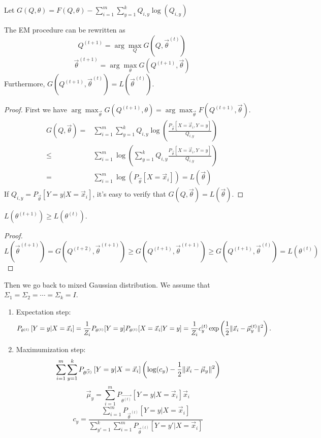 Let $ G(Q, \theta) = F(Q, \theta) - \sum^{m}_{i=1} \sum^{k}_{y=1} Q_{i,y} \log(Q_{i,y})  $

\begin{lemma}
    The EM procedure can be rewritten as
    \[
        Q^{(t+1)} = \arg\max_{Q} G(Q, \vec{\theta}^{(t)})
    \]
    \[
        \vec{\theta}^{(t+1)} = \arg\max_{\theta}G(Q ^{(t+1)}, \vec{\theta})
    \]
    Furthermore, $ G(Q^{(t+1)}, \vec{\theta}^{(t)}) = L(\vec{\theta}^{(t)}) $.
    \begin{proof}
        First we have $ \arg\max_{\vec{\theta}} G(Q^{(t+1)}, \theta) = \arg\max_{\vec{\theta}} F(Q^{(t+1)}, \vec{\theta})$.
        \begin{align*}
            G(Q, \vec{\theta}) =& \sum^{m}_{i=1} \sum^{k}_{y=1} Q_{i,y}\log \left( \frac{P_{\vec{\theta}} \left[ X = \vec{x}_i, Y = y \right]}{Q_{i,y}}  \right)\\
            \le& \sum^{m}_{i=1} \log \left( \sum^{k}_{y=1} Q_{i,y}\frac{P_{\vec{\theta}} \left[ X = \vec{x}_i, Y = y \right]}{Q_{i,y}}  \right)\\
            =& \sum^{m}_{i=1} \log \left( P_{\vec{\theta}}\left[ X = \vec{x}_i \right] \right) = L(\vec{\theta})
        \end{align*}
        If $ Q_{i,y} = P_{\vec{\theta}} \left[ Y = y | X = \vec{x}_i \right] $, it's easy to verify that $ G(Q, \vec{\theta}) = L(\vec{\theta}) $.
    \end{proof}
\end{lemma}
\begin{theorem}
    $ L(\theta^{(t+1)}) \ge L(\theta^{(t)}) $.
    \begin{proof}
        $ L(\vec{\theta}^{(t+1)}) = G(Q^{(t+2)}, \vec{\theta}^{(t+1)}) \ge G(Q^{(t+1)}, \vec{\theta}^{(t+1)}) \ge G(Q^{(t+1)}, \vec{\theta}^{(t)}) = L(\theta^{(t)}) $
    \end{proof}
\end{theorem}

Then we go back to mixed Gaussian distribution.
We assume that $ \Sigma_1 = \Sigma_2 = \cdots = \Sigma_k = I $.
\begin{enumerate}
    \item Expectation step:
        \[
            P_{\theta^{(t)}} \left[ Y = y | X = \vec{x}_i \right] = \frac{1}{Z_i} P_{\theta^{(t)}} [Y = y] P_{\theta^{(t)}}[X = \vec{x}_i | Y = y] = \frac{1}{Z_i} c^{(t)}_{y} \exp\left( \frac{1}{2} \Arrowvert \vec{x}_i - \vec{\mu}^{(t)}_{y} \Arrowvert^2 \right).
        \]
    \item Maximumization step:
        \[
            \sum^{m}_{i=1} \sum^{k}_{y=1} P_{\vec{\theta^{(t)}}}\left[ Y = y | X = \vec{x}_i \right] \left( \log(c_y) - \frac{1}{2} \Arrowvert \vec{x}_i - \vec{\mu}_y \Arrowvert^2 \right)
        \]
        \[
            \vec{\mu}_y = \sum^{m}_{i=1} P_{\vec{\theta^{(t)}}}\left[ Y = y | X = \vec{x}_i \right] \vec{x}_i
        \]
        \[
            c_y = \frac{ \sum^{m}_{i=1} P_{\vec{\theta}^{(t)}}\left[ Y = y | X = \vec{x}_i \right]}{ \sum^{k}_{y' = 1} \sum^{m}_{i=1} P_{\vec{\theta}^{(t)}} \left[ Y = y' | X = \vec{x}_i \right]} 
        \]
        
        
\end{enumerate}

